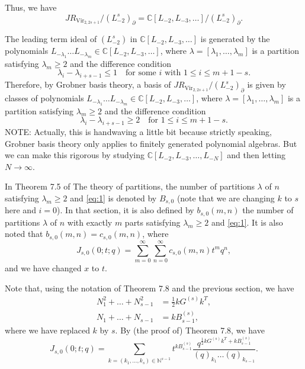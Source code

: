 \documentclass[a4paper, 12pt, reqno]{amsart}
\DeclareMathOperator{\Vir}{Vir}
\begin{document}
Thus, we have 
\begin{equation*}
  JR_{\Vir_{2, 2s + 1}}/(L_{-2}^s)_{\partial} = \mathbb{C}[L_{-2}, L_{-3}, \dots]/(L_{-2}^s)_{\partial}.
\end{equation*}

The leading term ideal of $(L_{-2}^s)$ in $\mathbb{C}[L_{-2}, L_{-3}, \dots]$ is generated by the polynomials $L_{-\lambda_1} \dots L_{-\lambda_m} \in \mathbb{C}[L_{-2}, L_{-3}, \dots]$, where $\lambda = [\lambda_1, \dots, \lambda_m]$ is a partition satisfying $\lambda_m \ge 2$ and the difference condition
\begin{equation*}
  \lambda_i - \lambda_{i + s - 1} \le 1 \quad \text{for some $i$ with $1 \le i \le m + 1 - s$}.
\end{equation*}
Therefore, by Grobner basis theory, a basis of $JR_{\Vir_{2, 2s + 1}}/(L_{-2}^s)_{\partial}$ is given by classes of polynomials $L_{-\lambda_1} \dots L_{-\lambda_m} \in \mathbb{C}[L_{-2}, L_{-3}, \dots]$, where $\lambda = [\lambda_1, \dots, \lambda_m]$ is a partition satisfying $\lambda_m \ge 2$ and the difference condition
\begin{equation}
  \label{eq:1}
  \lambda_i - \lambda_{i + s - 1} \ge 2 \quad \text{for $1 \le i \le m + 1 - s$}.
\end{equation}
NOTE: Actually, this is handwaving a little bit because strictly speaking, Grobner basis theory only applies to finitely generated polynomial algebras.
But we can make this rigorous by studying $\mathbb{C}[L_{-2}, L_{-3}, \dots, L_{-N}]$ and then letting $N \to \infty$.

In Theorem 7.5 of The theory of partitions, the number of partitions $\lambda$ of $n$ satisfying $\lambda_m \ge 2$ and \eqref{eq:1} is denoted by $B_{s, 0}$ (note that we are changing $k$ to $s$ here and $i = 0$).
In that section, it is also defined by $b_{s, 0}(m, n)$ the number of partitions $\lambda$ of $n$ with exactly $m$ parts satisfying $\lambda_m \ge 2$ and \eqref{eq:1}.
It is also noted that $b_{s, 0}(m, n) = c_{s, 0}(m, n)$, where
\begin{equation*}
  J_{s, 0}(0; t; q) = \sum_{m = 0}^{\infty}\sum_{n = 0}^{\infty}c_{s, 0}(m, n)t^mq^n,
\end{equation*}
and we have changed $x$ to $t$.

Note that, using the notation of Theorem 7.8 and the previous section, we have
\begin{align*}
  N_1^2 + \dots + N_{s - 1}^2 &= \frac{1}{2}kG^{(s)}k^T, \\
  N_1 + \dots + N_{s - 1} &= kB^{(s)}_{s - 1},
\end{align*}
where we have replaced $k$ by $s$.
By (the proof of) Theorem 7.8, we have
\begin{equation*}
  J_{s, 0}(0; t; q) = \sum_{k = (k_1, \dots, k_s) \in \mathbb{N}^{s - 1}}t^{kB^{(s)}_{s - 1}}\frac{q^{\frac{1}{2}kG^{(s)}k^T + kB^{(s)}_{s - 1}}}{(q)_{k_1}\dots(q)_{k_{s - 1}}}.
\end{equation*}
\end{document}
